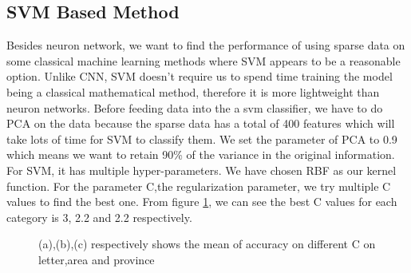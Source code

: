 \subsection{SVM Based Method}
Besides neuron network, we want to find the performance of using sparse data on some 
classical machine learning methods where SVM appears to be a reasonable option. 
Unlike CNN, SVM doesn't require us to spend time training the model being a classical 
mathematical method, therefore it is more lightweight than neuron networks. 
Before feeding data into the a svm classifier, we have to do PCA on the data because 
the sparse data has a total of 400 features which will take lots of time for SVM to classify them. 
We set the parameter of PCA to 0.9 which means we want to retain 90\% of the variance in the original 
information. For SVM, it has multiple hyper-parameters. 
We have chosen RBF as our kernel function. 
For the parameter C,the regularization parameter, we try multiple C values to find the best one. 
From figure \ref{svm}, we can see the best C values for each category is 3, 2.2 and 2.2 respectively.

\begin{figure}[ht]
\centering
{}
\qquad
{}
\qquad
{}
\qquad
\caption{(a),(b),(c) respectively shows the mean of accuracy on different C on letter,area and province}
\label{svm}
\end{figure}
